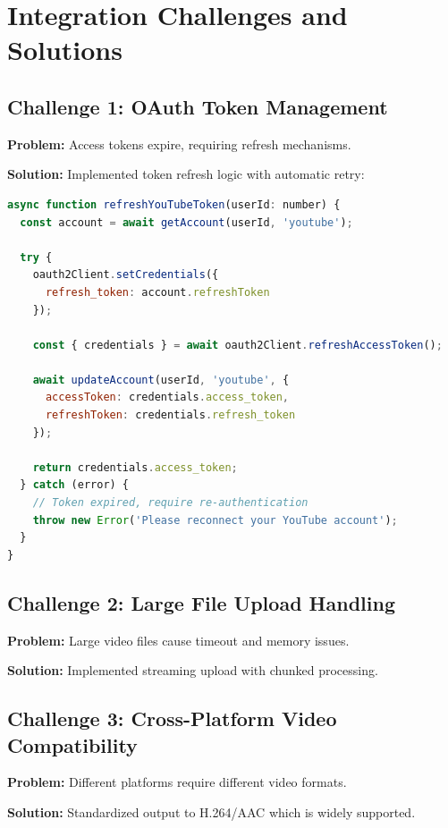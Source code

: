\section{Integration Challenges and Solutions}

\subsection{Challenge 1: OAuth Token Management}

\textbf{Problem:} Access tokens expire, requiring refresh mechanisms.

\textbf{Solution:} Implemented token refresh logic with automatic retry:

\begin{lstlisting}[language=JavaScript]
async function refreshYouTubeToken(userId: number) {
  const account = await getAccount(userId, 'youtube');
  
  try {
    oauth2Client.setCredentials({
      refresh_token: account.refreshToken
    });
    
    const { credentials } = await oauth2Client.refreshAccessToken();
    
    await updateAccount(userId, 'youtube', {
      accessToken: credentials.access_token,
      refreshToken: credentials.refresh_token
    });
    
    return credentials.access_token;
  } catch (error) {
    // Token expired, require re-authentication
    throw new Error('Please reconnect your YouTube account');
  }
}
\end{lstlisting}

\subsection{Challenge 2: Large File Upload Handling}

\textbf{Problem:} Large video files cause timeout and memory issues.

\textbf{Solution:} Implemented streaming upload with chunked processing.

\subsection{Challenge 3: Cross-Platform Video Compatibility}

\textbf{Problem:} Different platforms require different video formats.

\textbf{Solution:} Standardized output to H.264/AAC which is widely supported.


